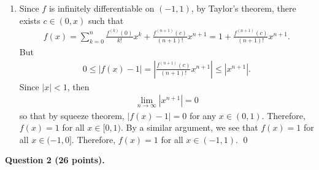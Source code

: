 \documentclass[11pt]{amsart}
\theoremstyle{plain}
\numberwithin{equation}{section}
\begin{document}
\begin{enumerate}[label=\textbf{(\alph*)}]
\begin{enumerate}[label=\textbf{(\roman*)}]
\begin{align*}
\end{align*}
Since $f'(0)=0$ and $f'\left(1/m+1\right)=0$ for each $m\in\mathbb{N}$, by the mean value theorem, there exists $a_{m}^{(2)}\in\left(0,1/(m+1)\right)$ such that $f''\left(a_{m}^{(2)}\right)=0$. Moreover, \[\lim_{m\to\infty}a_{m}^{(2)}= 0.\]
Since $f''$ is continuous, then $f''(0)=0$. 
\newline
\newline Now suppose that $f^{(n-1)}(0)=0$ and there exists a sequence $\left\{a_{m}^{(n-1)}\right\}_{m=1}^{\infty}$ such that $f^{(n-1)}\left(a_{m}^{(n-1)}\right)=0$ for each $m$ and $a_{m}^{(n-1)}\to 0$ as $m\to\infty$. By a similar construction as above, by the mean value theorem, we can find a sequence $\left\{a_{m}^{(n)}\right\}_{m=1}^{\infty}$ such that $0<a_{m}^{(n)}<a_{m}^{(n-1)}$ for each $m$ and $a_{m}^{(n)}\to 0$ and $f^{(n)}\left(a_{m}^{(n)}\right)=0$ for each $m\in\mathbb{N}$. By the continuity of $f^{(n)}$, we have 
\begin{align*}
    0=\lim_{m\to\infty}f^{(n)}\left(a_{m}^{(n)}\right)=f^{(n)}(0).
\end{align*}
Hence, by induction, $f^{(n)}(0)$ for each $n\in\mathbb{N}$.
\item Since $f$ is infinitely differentiable on $(-1,1)$, by Taylor's theorem, there exists $c\in\left(0,x\right)$ such that
\begin{align*}
    f(x)=\sum_{k=0}^{n}\frac{f^{(k)}(0)}{k!}x^{k}+\frac{f^{(n+1)}(c)}{(n+1)!}x^{n+1}=1+\frac{f^{(n+1)}(c)}{(n+1)!}x^{n+1}.
\end{align*}
But
\begin{align*}
    0\leq\left|f(x)-1\right|=\left|\frac{f^{(n+1)}(c)}{(n+1)!}x^{n+1}\right|\leq\left|x^{n+1}\right|.
\end{align*}
Since $|x|<1$, then 
\begin{align*}
    \lim_{n\to\infty}\left|x^{n+1}\right|=0
\end{align*}
so that by squeeze theorem, $\left|f(x)-1\right|=0$ for any $x\in(0,1)$. Therefore, $f(x)=1$ for all $x\in[0,1)$. By a similar argument, we see that $f(x)=1$ for all $x\in(-1,0]$. Therefore, $f(x)=1$ for all $x\in(-1,1)$. \qed 
\end{enumerate}
\end{enumerate}
\noindent\textbf{Question 2 (26 points).} 
\end{document}
